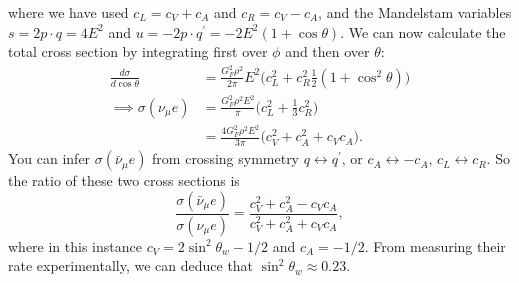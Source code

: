 where we have used $c_L = c_V + c_A$ and $c_R = c_V-c_A$, and the Mandelstam variables $s=2 p \cdot q = 4E^2$ and $u=-2p \cdot q^\prime = -2E^2(1+ \cos\theta)$. We can now calculate the total cross section by integrating first over $\phi$ and then over $\theta$:
\begin{equation}
\begin{split}
\frac{d\sigma}{d\cos\theta} &= \frac{G_F^2 \rho^2}{2 \pi} E^2 \big(c_L^2 + c_R^2\frac{1}{2}(1 + \cos^2\theta)\big) \\
\implies \sigma(\nu_\mu e) &= \frac{G_F^2 \rho^2 E^2}{\pi} \big(c_L^2 + \frac{1}{3}c_R^2\big) \\
&= \frac{4G_F^2 \rho^2E^2}{3 \pi}\big(c_V^2 + c_A^2 + c_V c_A\big).
\end{split}
\end{equation}
You can infer $\sigma(\bar{\nu}_\mu e)$ from crossing symmetry $q \leftrightarrow q^\prime$, or $c_A \leftrightarrow -c_A$, $c_L \leftrightarrow c_R$. So the ratio of these two cross sections is
\begin{equation}
\frac{\sigma(\bar{\nu}_\mu e)}{\sigma(\nu_\mu e)} = \frac{c_V^2 + c_A^2 - c_Vc_A}{c_V^2 + c_A^2 + c_V c_A},
\end{equation}
where in this instance $c_V = 2 \sin^2\theta_w -1/2$ and $c_A = -1/2$. From measuring their rate experimentally, we can deduce that $\sin^2\theta_w \approx 0.23$. 

